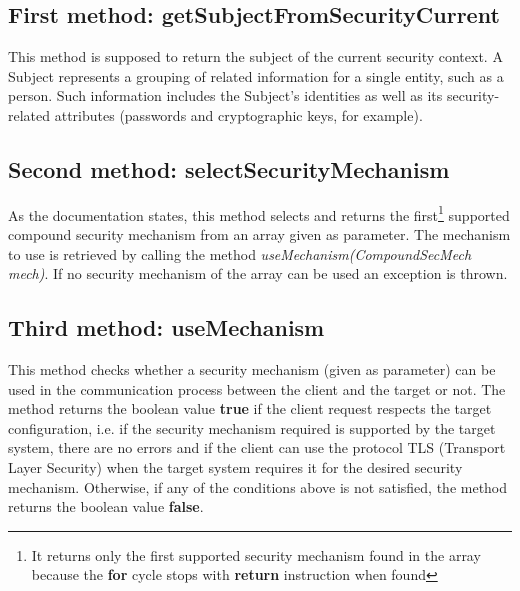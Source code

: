 \documentclass[\mainpath/main]{subfiles}
\begin{document}
\subsection{First method: getSubjectFromSecurityCurrent}
\label{Assignment:AssignedMethods:FirstMethod}
This method is supposed to return the subject of the current security context. A Subject represents a grouping of related information for a single entity, such as a person. Such information includes the Subject's identities as well as its security-related attributes (passwords and cryptographic keys, for example).

\subsection{Second method: selectSecurityMechanism}
\label{Assignment:AssignedMethods:SecondMethod}
As the documentation states, this method selects and returns the first\footnote{It returns only the first supported security mechanism found in the array because the \textbf{\color{javapurple} for} cycle stops with \textbf{\color{javapurple} return} instruction when found} supported compound security mechanism from an array given as parameter. The mechanism to use is retrieved by calling the method \textit{useMechanism(CompoundSecMech mech)}. If no security mechanism of the array can be used an exception is thrown.

\subsection{Third method: useMechanism}
\label{Assignment:AssignedMethods:ThirdMethod}
This method checks whether a security mechanism (given as parameter) can be used in the communication process between the client and the target or not. The method returns the boolean value \textbf{\color{javapurple} true} if the client request respects the target configuration, i.e. if the security mechanism required is supported by the target system, there are no errors and if the client can use the protocol TLS (Transport Layer Security) when the target system requires it for the desired security mechanism. Otherwise, if any of the conditions above is not satisfied, the method returns the boolean value \textbf{\color{javapurple} false}.
\end{document}
